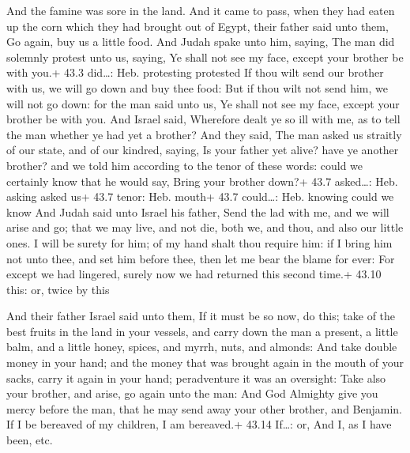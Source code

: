  And the famine was sore in the land.  And it
came to pass, when they had eaten up the corn which they had brought out
of Egypt, their father said unto them, Go again, buy us a little food.
 And Judah spake unto him, saying, The man did solemnly
protest unto us, saying, Ye shall not see my face, except your brother
be with you.+ 43.3 did\ldots: Heb. protesting protested  If
thou wilt send our brother with us, we will go down and buy thee food:
 But if thou wilt not send him, we will not go down: for the
man said unto us, Ye shall not see my face, except your brother be with
you.  And Israel said, Wherefore dealt ye so ill with me, as
to tell the man whether ye had yet a brother?  And they
said, The man asked us straitly of our state, and of our kindred,
saying, Is your father yet alive? have ye another brother? and we told
him according to the tenor of these words: could we certainly know that
he would say, Bring your brother down?+ 43.7 asked\ldots: Heb. asking
asked us+ 43.7 tenor: Heb. mouth+ 43.7 could\ldots: Heb. knowing could
we know  And Judah said unto Israel his father, Send the lad
with me, and we will arise and go; that we may live, and not die, both
we, and thou, and also our little ones.  I will be surety
for him; of my hand shalt thou require him: if I bring him not unto
thee, and set him before thee, then let me bear the blame for ever:
 For except we had lingered, surely now we had returned
this second time.+ 43.10 this: or, twice by this

 And their father Israel said unto them, If it must be so
now, do this; take of the best fruits in the land in your vessels, and
carry down the man a present, a little balm, and a little honey, spices,
and myrrh, nuts, and almonds:  And take double money in
your hand; and the money that was brought again in the mouth of your
sacks, carry it again in your hand; peradventure it was an oversight:
 Take also your brother, and arise, go again unto the man:
 And God Almighty give you mercy before the man, that he
may send away your other brother, and Benjamin. If I be bereaved of my
children, I am bereaved.+ 43.14 If\ldots: or, And I, as I have been,
etc.

